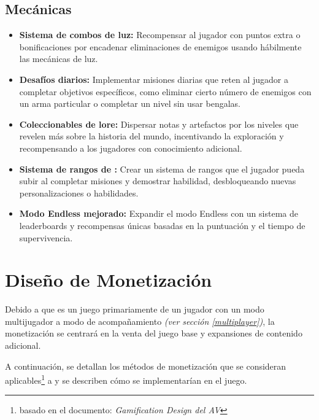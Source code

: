     \subsection{Mecánicas}
    \begin{itemize}
        \item \textbf{Sistema de combos de luz:} Recompensar al jugador con puntos extra o bonificaciones por encadenar eliminaciones de enemigos usando hábilmente las mecánicas de luz.
        \item \textbf{Desafíos diarios:} Implementar misiones diarias que reten al jugador a completar objetivos específicos, como eliminar cierto número de enemigos con un arma particular o completar un nivel sin usar bengalas.
        \item \textbf{Coleccionables de lore:} Dispersar notas y artefactos por los niveles que revelen más sobre la historia del mundo, incentivando la exploración y recompensando a los jugadores con conocimiento adicional.
        \item \textbf{Sistema de rangos de \hunter:} Crear un sistema de rangos que el jugador pueda subir al completar misiones y demostrar habilidad, desbloqueando nuevas personalizaciones o habilidades.
        \item \textbf{Modo Endless mejorado:} Expandir el modo Endless con un sistema de leaderboards y recompensas únicas basadas en la puntuación y el tiempo de supervivencia.
    \end{itemize}

\newpage

\section{Diseño de Monetización}
    Debido a que \gameTitle es un juego primariamente de un jugador con un modo multijugador a modo de acompañamiento \textit{(ver sección \ref{multiplayer})}, la monetización se centrará en la venta del juego base y expansiones de contenido adicional.

    A continuación, se detallan los métodos de monetización que se consideran aplicables\footnote{basado en el documento: \textit{Gamification Design del AV}} a \gameTitle y se describen cómo se implementarían en el juego.

